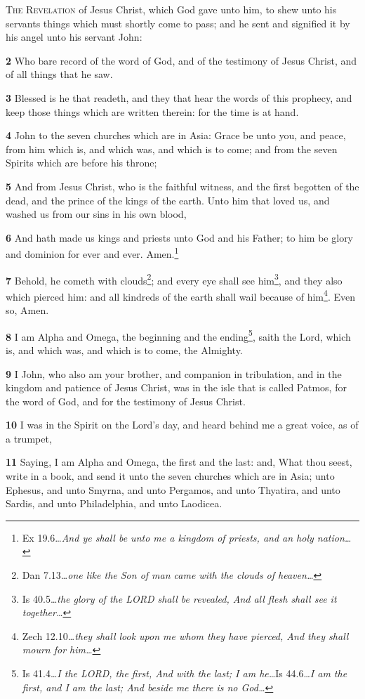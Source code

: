 \documentclass[11pt,a4paper,twocolumn,twoside]{book}
\newcommand{\bibref}[2]{{#1}\ldots\textit{{#2}\ldots}}
\newcommand{\bibfootnote}[2]{\footnote{\bibref{#1}{#2}}}
\newcommand{\dibibref}[4]{\bibref{#1}{#2}\bibref{#3}{#4}}
\newcommand{\dibibfootnote}[4]{\footnote{\dibibref{#1}{#2}{#3}{#4}}}
\newcommand{\vn}[1]{{\scriptsize\textbf{#1}}}
\begin{document}
\frontmatter
\lettrine[lines=4,lraise=0.1]{T}{he Revelation} of Jesus Christ, which God gave unto him, to shew unto his servants things which must shortly come to pass; and he sent and signified it by his angel unto his servant John:

\vn{2} Who bare record of the word of God, and of the testimony of Jesus Christ, and of all things that he saw.

\vn{3} Blessed is he that readeth, and they that hear the words of this prophecy, and keep those things which are written therein: for the time is at hand.

\vn{4} John to the seven churches which are in Asia: Grace be unto you, and peace, from him which is, and which was, and which is to come; and from the seven Spirits which are before his throne;

\vn{5} And from Jesus Christ, who is the faithful witness, and the first begotten of the dead, and the prince of the kings of the earth. Unto him that loved us, and washed us from our sins in his own blood,

\vn{6} And hath made us kings and priests unto God and his Father; to him be glory and dominion for ever and ever. Amen.\bibfootnote{Ex 19.6}{And ye shall be unto me a kingdom of priests, and an holy nation}	

\vn{7} Behold, he cometh with clouds\bibfootnote{Dan 7.13}{one like the Son of man came with the clouds of heaven}; and every eye shall see him\bibfootnote{Is 40.5}{the glory of the LORD shall be revealed, And all flesh shall see it together}, and they also which pierced him: and all kindreds of the earth shall wail because of him\bibfootnote{Zech 12.10}{they shall look upon me whom they have pierced, And they shall mourn for him}. Even so, Amen. 

\vn{8} I am Alpha and Omega, the beginning and the ending\dibibfootnote{Is 41.4}{I the LORD, the first, And with the last; I am he}{Is 44.6}{I am the first, and I am the last; And beside me there is no God}, saith the Lord, which is, and which was, and which is to come, the Almighty.

\vn{9} I John, who also am your brother, and companion in tribulation, and in the kingdom and patience of Jesus Christ, was in the isle that is called Patmos, for the word of God, and for the testimony of Jesus Christ.

\vn{10} I was in the Spirit on the Lord’s day, and heard behind me a great voice, as of a trumpet,

\vn{11} Saying, I am Alpha and Omega, the first and the last: and, What thou seest, write in a book, and send it unto the seven churches which are in Asia; unto Ephesus, and unto Smyrna, and unto Pergamos, and unto Thyatira, and unto Sardis, and unto Philadelphia, and unto Laodicea.
\end{document}
